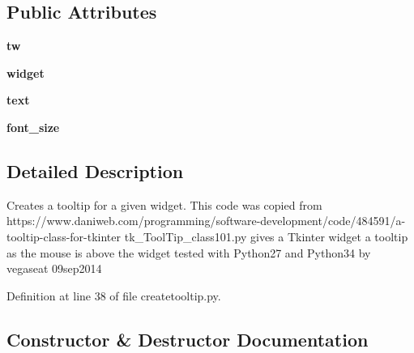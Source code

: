 \subsection*{Public Attributes}
\begin{DoxyCompactItemize}
\item 
{\bfseries tw}\hypertarget{classnegui_1_1createtooltip_1_1CreateToolTip_ac47a0f82a5a354f6c8914c4631d1a0cf}{}\label{classnegui_1_1createtooltip_1_1CreateToolTip_ac47a0f82a5a354f6c8914c4631d1a0cf}

\item 
{\bfseries widget}\hypertarget{classnegui_1_1createtooltip_1_1CreateToolTip_a6619448e568b135261fd02a6d9b36725}{}\label{classnegui_1_1createtooltip_1_1CreateToolTip_a6619448e568b135261fd02a6d9b36725}

\item 
{\bfseries text}\hypertarget{classnegui_1_1createtooltip_1_1CreateToolTip_a198b3395803def62ec55ed820e756b11}{}\label{classnegui_1_1createtooltip_1_1CreateToolTip_a198b3395803def62ec55ed820e756b11}

\item 
{\bfseries font\+\_\+size}\hypertarget{classnegui_1_1createtooltip_1_1CreateToolTip_a42f2306cb6ad9995d76e0eb556416bed}{}\label{classnegui_1_1createtooltip_1_1CreateToolTip_a42f2306cb6ad9995d76e0eb556416bed}

\end{DoxyCompactItemize}


\subsection{Detailed Description}
\begin{DoxyVerb}Creates a tooltip for a given widget.
This code was copied from 
https://www.daniweb.com/programming/software-development/code/484591/a-tooltip-class-for-tkinter
tk_ToolTip_class101.py
gives a Tkinter widget a tooltip as the mouse is above the widget
tested with Python27 and Python34  by  vegaseat  09sep2014\end{DoxyVerb}
 

Definition at line 38 of file createtooltip.\+py.



\subsection{Constructor \& Destructor Documentation}
